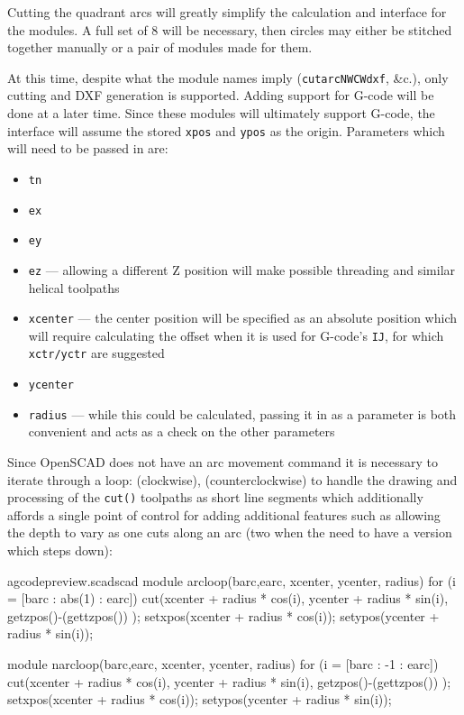 \documentclass{ltxdoc}
\begin{document}
Cutting the quadrant arcs will greatly simplify the calculation and interface for the modules.
A full set of 8 will be necessary, then circles may either be stitched together manually or
a pair of modules made for them.
 
At this time, despite what the module names imply (\texttt{cutarcNWCWdxf}, \&c.), only cutting  
and DXF generation is supported. Adding support for G-code will be done at a later time.
Since these modules will ultimately support G-code, the interface will assume the stored
\texttt{xpos} and \texttt{ypos} as the origin. Parameters which will need to be passed in are:
 
\begin{itemize}
 \item \texttt{tn}
 \item \texttt{ex}
 \item \texttt{ey}
 \item \texttt{ez} --- allowing a different Z position will make possible threading and
                       similar helical toolpaths
\item \texttt{xcenter} --- the center position will be specified as an absolute position
      which will require calculating the offset when it is used for G-code's \texttt{IJ},
      for which \texttt{xctr/yctr} are suggested 
\item \texttt{ycenter}
\item \texttt{radius} --- while this could be calculated, passing it in as a parameter
      is both convenient and acts as a check on the other parameters
\end{itemize}

Since OpenSCAD does not have an arc movement command it is necessary to iterate through a loop:  (clockwise), 
(counterclockwise) to handle the drawing and processing of the \texttt{cut()} toolpaths as 
short line segments which additionally affords a single point of control for adding additional
features such as allowing the depth to  vary as one cuts along an arc (two when the need to have 
a version which steps down):

\lstset{firstnumber=\thegcpscad}
\begin{writecode}{a}{gcodepreview.scad}{scad}
module arcloop(barc,earc, xcenter, ycenter, radius) {
  for (i = [barc : abs(1) : earc]) {
        cut(xcenter + radius * cos(i),
        ycenter + radius * sin(i),
        getzpos()-(gettzpos())
        );
    setxpos(xcenter + radius * cos(i));
    setypos(ycenter + radius * sin(i));
  }
}

module narcloop(barc,earc, xcenter, ycenter, radius) {
  for (i = [barc : -1 : earc]) {
        cut(xcenter + radius * cos(i),
        ycenter + radius * sin(i),
        getzpos()-(gettzpos())
        );
    setxpos(xcenter + radius * cos(i));
    setypos(ycenter + radius * sin(i));
  }
}

\end{writecode}
\addtocounter{gcpscad}{22}
 
\end{document}
